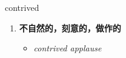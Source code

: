 
\begin{frame}
{\huge contrived}
\begin{center}
\begin{enumerate}\Large
  \item \textbf{不自然的，刻意的，做作的}
  \begin{itemize}
    \item \em{\Large{contrived applause}}
  \end{itemize}
\end{enumerate}
\end{center}
\end{frame}
